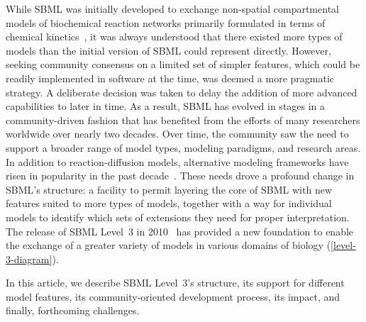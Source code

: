 \documentclass{sbml-paper}
\begin{document}
While SBML was initially developed to exchange non-spatial compartmental models of biochemical reaction networks primarily formulated in terms of chemical kinetics~\citep{hucka_2002}, it was always understood that there existed more types of models than the initial version of SBML could represent directly. However, seeking community consensus on a limited set of simpler features, which could be readily implemented in software at the time, was deemed a more pragmatic strategy. A deliberate decision was taken to delay the addition of more advanced capabilities to later in time.  As a result, SBML has evolved in stages in a community-driven fashion that has benefited from the efforts of many researchers worldwide over nearly two decades.  Over time, the community saw the need to support a broader range of model types, modeling paradigms, and research areas. In addition to reaction-diffusion models, alternative modeling frameworks have risen in popularity in the past decade~\citep{Machado2011modelinga}. These needs drove a profound change in SBML's structure: a facility to permit layering the core of SBML with new features suited to more types of models, together with a way for individual models to identify which sets of extensions they need for proper interpretation. The release of SBML Level~3 in 2010~\citep{Hucka2015} has provided a new foundation to enable the exchange of a greater variety of models in various domains of biology (\autoref{level-3-diagram}).

In this article, we describe SBML Level~3's structure, its support for different model features, its community-oriented development process, its impact, and finally, forthcoming challenges.
\end{document}
